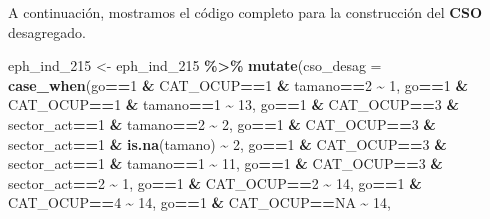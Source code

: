 \documentclass[
]{article}
\newenvironment{Shaded}{\begin{snugshade}}{\end{snugshade}}
\newcommand{\AttributeTok}[1]{\textcolor[rgb]{0.13,0.29,0.53}{#1}}
\newcommand{\ConstantTok}[1]{\textcolor[rgb]{0.56,0.35,0.01}{#1}}
\newcommand{\DecValTok}[1]{\textcolor[rgb]{0.00,0.00,0.81}{#1}}
\newcommand{\FunctionTok}[1]{\textcolor[rgb]{0.13,0.29,0.53}{\textbf{#1}}}
\newcommand{\NormalTok}[1]{#1}
\newcommand{\OtherTok}[1]{\textcolor[rgb]{0.56,0.35,0.01}{#1}}
\newcommand{\SpecialCharTok}[1]{\textcolor[rgb]{0.81,0.36,0.00}{\textbf{#1}}}
\begin{document}
A continuación, mostramos el código completo para la construcción del \textbf{CSO} desagregado.

\begin{Shaded}
\begin{Highlighting}[]
\NormalTok{eph\_ind\_215 }\OtherTok{\textless{}{-}}\NormalTok{ eph\_ind\_215 }\SpecialCharTok{\%\textgreater{}\%} 
  \FunctionTok{mutate}\NormalTok{(}\AttributeTok{cso\_desag =} \FunctionTok{case\_when}\NormalTok{(go}\SpecialCharTok{==}\DecValTok{1} \SpecialCharTok{\&}\NormalTok{ CAT\_OCUP}\SpecialCharTok{==}\DecValTok{1} \SpecialCharTok{\&}\NormalTok{ tamano}\SpecialCharTok{==}\DecValTok{2} \SpecialCharTok{\textasciitilde{}} \DecValTok{1}\NormalTok{, }
\NormalTok{                               go}\SpecialCharTok{==}\DecValTok{1} \SpecialCharTok{\&}\NormalTok{ CAT\_OCUP}\SpecialCharTok{==}\DecValTok{1} \SpecialCharTok{\&}\NormalTok{ tamano}\SpecialCharTok{==}\DecValTok{1} \SpecialCharTok{\textasciitilde{}} \DecValTok{13}\NormalTok{, }
\NormalTok{                               go}\SpecialCharTok{==}\DecValTok{1} \SpecialCharTok{\&}\NormalTok{ CAT\_OCUP}\SpecialCharTok{==}\DecValTok{3} \SpecialCharTok{\&}\NormalTok{ sector\_act}\SpecialCharTok{==}\DecValTok{1} \SpecialCharTok{\&}\NormalTok{ tamano}\SpecialCharTok{==}\DecValTok{2} \SpecialCharTok{\textasciitilde{}} \DecValTok{2}\NormalTok{, }
\NormalTok{                               go}\SpecialCharTok{==}\DecValTok{1} \SpecialCharTok{\&}\NormalTok{ CAT\_OCUP}\SpecialCharTok{==}\DecValTok{3} \SpecialCharTok{\&}\NormalTok{ sector\_act}\SpecialCharTok{==}\DecValTok{1} \SpecialCharTok{\&} \FunctionTok{is.na}\NormalTok{(tamano) }\SpecialCharTok{\textasciitilde{}} \DecValTok{2}\NormalTok{, }
\NormalTok{                               go}\SpecialCharTok{==}\DecValTok{1} \SpecialCharTok{\&}\NormalTok{ CAT\_OCUP}\SpecialCharTok{==}\DecValTok{3} \SpecialCharTok{\&}\NormalTok{ sector\_act}\SpecialCharTok{==}\DecValTok{1} \SpecialCharTok{\&}\NormalTok{ tamano}\SpecialCharTok{==}\DecValTok{1} \SpecialCharTok{\textasciitilde{}} \DecValTok{11}\NormalTok{, }
\NormalTok{                               go}\SpecialCharTok{==}\DecValTok{1} \SpecialCharTok{\&}\NormalTok{ CAT\_OCUP}\SpecialCharTok{==}\DecValTok{3} \SpecialCharTok{\&}\NormalTok{ sector\_act}\SpecialCharTok{==}\DecValTok{2} \SpecialCharTok{\textasciitilde{}} \DecValTok{1}\NormalTok{,}
\NormalTok{                               go}\SpecialCharTok{==}\DecValTok{1} \SpecialCharTok{\&}\NormalTok{ CAT\_OCUP}\SpecialCharTok{==}\DecValTok{2} \SpecialCharTok{\textasciitilde{}} \DecValTok{14}\NormalTok{,}
\NormalTok{                               go}\SpecialCharTok{==}\DecValTok{1} \SpecialCharTok{\&}\NormalTok{ CAT\_OCUP}\SpecialCharTok{==}\DecValTok{4} \SpecialCharTok{\textasciitilde{}} \DecValTok{14}\NormalTok{,}
\NormalTok{                               go}\SpecialCharTok{==}\DecValTok{1} \SpecialCharTok{\&}\NormalTok{ CAT\_OCUP}\SpecialCharTok{==}\ConstantTok{NA} \SpecialCharTok{\textasciitilde{}} \DecValTok{14}\NormalTok{,}
                               

\end{Highlighting}
\end{Shaded}
\end{document}
